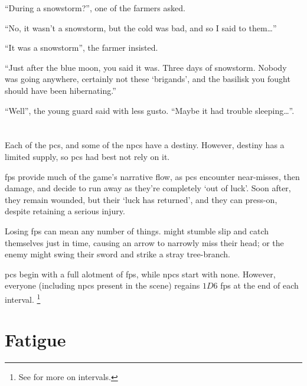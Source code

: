 \begin{multicols}{2}
\begin{exampletext}
  ``During a snowstorm?'', one of the farmers asked.

  ``No, it wasn't a snowstorm, but the cold was bad, and so I said to them\ldots''

  ``It was a snowstorm'', the farmer insisted.

  ``Just after the blue moon, you said it was.
  Three days of snowstorm.
  Nobody was going anywhere, certainly not these `brigands', and the basilisk you fought should have been hibernating.''

  ``Well'', the young \gls{guard} said with less gusto.
  ``Maybe it had trouble sleeping\ldots''.

\end{exampletext}

\end{multicols}

\section{}
\label{fate_points}

\begin{multicols}{2}

\noindent
Each of the \glspl{pc}, and some of the \glspl{npc} have a destiny.
However, destiny has a limited supply, so \glspl{pc} had best not rely on it.



\Glspl{fp} provide much of the game's narrative flow, as \glspl{pc} encounter near-misses, then damage, and decide to run away as they're completely `out of luck'.
Soon after, they remain wounded, but their `luck has returned', and they can press-on, despite retaining a serious injury.

Losing \glspl{fp} can mean any number of things.
 might stumble slip and catch themselves just in time, causing an arrow to narrowly miss their head; or the enemy might swing their sword and strike a stray tree-branch.

\Glspl{pc} begin with a full alotment of \glspl{fp}, while \glspl{npc} start with none.
However, everyone (including \glspl{npc} present in the scene) regains $1D6$ \glspl{fp} at the end of each \gls{interval}.%
\footnote{See  for more on \glspl{interval}.}

\end{multicols}

\section{Fatigue}

